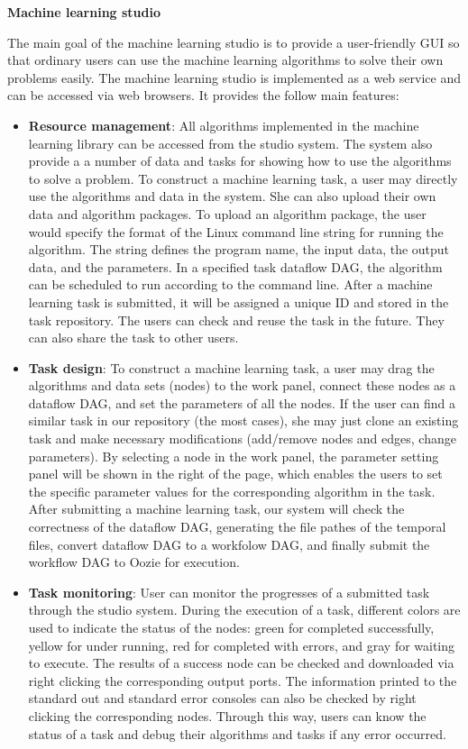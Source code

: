 \documentclass{sig-alternate-05-2015}
\begin{document}
\noindent\textbf{Machine learning studio}

The main goal of the machine learning studio is to provide a user-friendly GUI so that ordinary users can use the machine learning algorithms to solve their own problems easily. The machine learning studio is implemented as a web service and can be accessed via web browsers. It provides the follow main features:
\begin{itemize}
    \item \textbf{Resource management}: All algorithms implemented in the machine learning library can be accessed from the studio system. The system also provide a a number of data and tasks for showing how to use the algorithms to solve a problem. To construct a machine learning task, a user may directly use the algorithms and data in the system. She can also upload their own data and algorithm packages. To upload an algorithm package, the user would specify the format of the Linux command line string for running the algorithm. The string defines the program name, the input data, the output data, and the parameters. In a specified task dataflow DAG, the algorithm can be scheduled to run according to the command line. After a machine learning task is submitted, it will be assigned a unique ID and stored in the task repository. The users can check and reuse the task in the future. They can also share the task to other users.

    \item \textbf{Task design}: To construct a machine learning task, a user may drag the algorithms and data sets (nodes) to the work panel, connect these nodes as a dataflow DAG, and set the parameters of all the nodes. If the user can find a similar task in our repository (the most cases), she may just clone an existing task and make necessary modifications (add/remove nodes and edges, change parameters). By selecting a node in the work panel, the parameter setting panel will be shown in the right of the page, which enables the users to set the specific parameter values for the corresponding algorithm in the task. After submitting a machine learning task, our system will check the correctness of the dataflow DAG, generating the file pathes of the temporal files, convert dataflow DAG to a workfolow DAG, and finally submit the workflow DAG to Oozie for execution.
    
    \item \textbf{Task monitoring}: User can monitor the progresses of a submitted task through the studio system. During the execution of a task, different colors are used to indicate the status of the nodes: green for completed successfully, yellow for under running, red for completed with errors, and gray for waiting to execute. The results of a success node can be checked and downloaded via right clicking the corresponding output ports. The information printed to the standard out and standard error consoles can also be checked by right clicking the corresponding nodes. Through this way, users can know the status of a task and debug their algorithms and tasks if any error occurred. 
        

\end{itemize}
\end{document}
